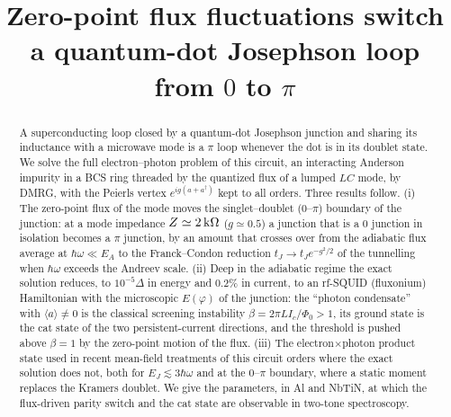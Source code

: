 \documentclass[aps,prl,twocolumn,superscriptaddress,amsmath,amssymb,floatfix]{revtex4-2}
\begin{document}
\title{Zero-point flux fluctuations switch a quantum-dot Josephson loop from $0$ to $\pi$}
\begin{abstract}
A superconducting loop closed by a quantum-dot Josephson junction and sharing its inductance with
a microwave mode is a $\pi$ loop whenever the dot is in its doublet state. We solve the full
electron--photon problem of this circuit, an interacting Anderson impurity in a BCS ring threaded by
the quantized flux of a lumped $LC$ mode, by DMRG, with the Peierls vertex $e^{ig(a+a^\dagger)}$ kept to all
orders. Three results follow. (i) The zero-point flux of the mode moves the singlet--doublet ($0$--$\pi$)
boundary of the junction: at a mode impedance $Z\simeq2\,{\rm k}\Omega$ ($g\simeq0.5$) a junction that is a $0$ junction
in isolation becomes a $\pi$ junction, by an amount that crosses over from the adiabatic flux average at
$\hbar\omega\ll E_A$ to the Franck--Condon reduction $t_J\to t_Je^{-g^2/2}$ of the tunnelling when $\hbar\omega$
exceeds the Andreev scale. (ii) Deep in the adiabatic regime the exact solution reduces, to $10^{-5}\Delta$ in
energy and $0.2\%$ in current, to an rf-SQUID (fluxonium) Hamiltonian with the microscopic $E(\varphi)$ of the
junction: the ``photon condensate'' with $\langle a\rangle\neq0$ is the classical screening instability
$\beta=2\pi LI_c/\Phi_0>1$, its ground state is the cat state of the two persistent-current directions, and
the threshold is pushed above $\beta=1$ by the zero-point motion of the flux. (iii) The electron$\times$photon
product state used in recent mean-field treatments of this circuit orders where the exact solution does not,
both for $E_J\lesssim3\hbar\omega$ and at the $0$--$\pi$ boundary, where a static moment replaces the Kramers
doublet. We give the parameters, in Al and NbTiN, at which the flux-driven parity switch and the cat state
are observable in two-tone spectroscopy.
\end{abstract}
\maketitle






\clearpage

\end{document}
